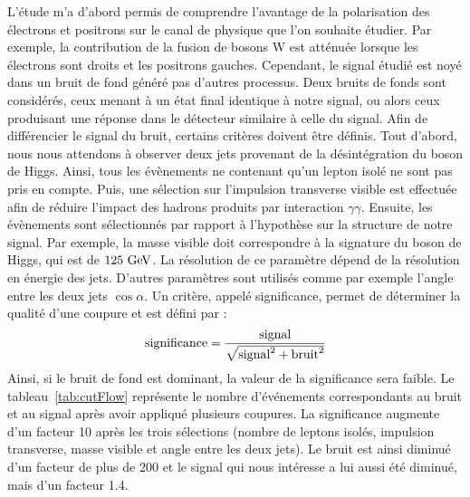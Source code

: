   L'étude m'a d'abord permis de comprendre l'avantage de la polarisation des électrons et positrons sur le canal de physique que l'on souhaite étudier.
  Par exemple, la contribution de la fusion de bosons W est atténuée lorsque les électrons sont droits et les positrons gauches.
  Cependant, le signal étudié est noyé dans un bruit de fond généré pas d'autres processus.
  Deux bruits de fonds sont considérés, ceux menant à un état final identique à notre signal, ou alors ceux produisant une réponse dans le détecteur similaire à celle du signal.
  Afin de différencier le signal du bruit, certains critères doivent être définis.
  Tout d'abord, nous nous attendons à observer deux jets provenant de la désintégration du boson de Higgs. 
  Ainsi, tous les évènements ne contenant qu'un lepton isolé ne sont pas pris en compte.
  Puis, une sélection sur l'impulsion transverse visible est effectuée afin de réduire l'impact des hadrons produits par interaction $\gamma\gamma$.
  Ensuite, les évènements sont sélectionnés par rapport à l'hypothèse sur la structure de notre signal.
  Par exemple, la masse visible doit correspondre à la signature du boson de Higgs, qui est de $125~\rm{GeV}$.
  La résolution de ce paramètre dépend de la résolution en énergie des jets. 
  D'autres paramètres sont utilisés comme par exemple l'angle entre les deux jets $\cos{\alpha}$.
  Un critère, appelé significance, permet de déterminer la qualité d'une coupure et est défini par :
  \begin{equation}
    \rm{significance} = \frac{\rm{signal}}{\sqrt{\rm{signal}^2 + \rm{bruit}^2}}
  \end{equation}
  Ainsi, si le bruit de fond est dominant, la valeur de la significance sera faible.
  Le tableau~\ref{tab:cutFlow} représente le nombre d'événements correspondants au bruit et au signal après avoir appliqué plusieurs coupures.
  La significance augmente d'un facteur 10 après les trois sélections (nombre de leptons isolés, impulsion transverse, masse visible et angle entre les deux jets).
  Le bruit est ainsi diminué d'un facteur de plus de 200 et le signal qui nous intéresse a lui aussi été diminué, mais d'un facteur 1.4. 

